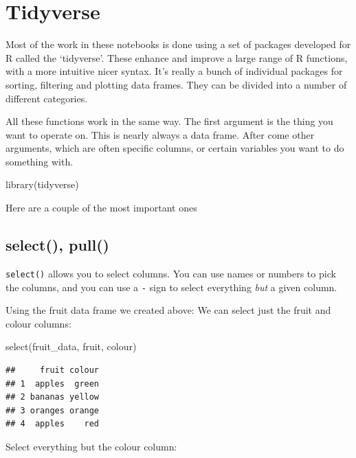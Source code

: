 \documentclass[
]{book}
\newenvironment{Shaded}{\begin{snugshade}}{\end{snugshade}}
\newcommand{\FunctionTok}[1]{\textcolor[rgb]{0.00,0.00,0.00}{#1}}
\newcommand{\NormalTok}[1]{#1}
\begin{document}
\hypertarget{tidyverse}{%
\section{Tidyverse}\label{tidyverse}}

Most of the work in these notebooks is done using a set of packages developed for R called the `tidyverse'. These enhance and improve a large range of R functions, with a more intuitive nicer syntax. It's really a bunch of individual packages for sorting, filtering and plotting data frames. They can be divided into a number of different categories.

All these functions work in the same way. The first argument is the thing you want to operate on. This is nearly always a data frame. After come other arguments, which are often specific columns, or certain variables you want to do something with.

\begin{Shaded}
\begin{Highlighting}[]
\FunctionTok{library}\NormalTok{(tidyverse)}
\end{Highlighting}
\end{Shaded}

Here are a couple of the most important ones

\hypertarget{select-pull}{%
\subsection{select(), pull()}\label{select-pull}}

\texttt{select()} allows you to select columns. You can use names or numbers to pick the columns, and you can use a \texttt{-} sign to select everything \emph{but} a given column.

Using the fruit data frame we created above: We can select just the fruit and colour columns:

\begin{Shaded}
\begin{Highlighting}[]
\FunctionTok{select}\NormalTok{(fruit\_data, fruit, colour)}
\end{Highlighting}
\end{Shaded}

\begin{verbatim}
##     fruit colour
## 1  apples  green
## 2 bananas yellow
## 3 oranges orange
## 4  apples    red
\end{verbatim}

Select everything but the colour column:
\end{document}
